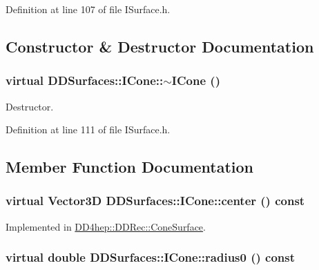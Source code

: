 Definition at line 107 of file ISurface.h.

\subsection{Constructor \& Destructor Documentation}
\hypertarget{class_d_d_surfaces_1_1_i_cone_a7693726c5c65f892a24e244b12acbf17}{
\subsubsection[{$\sim$ICone}]{\setlength{\rightskip}{0pt plus 5cm}virtual DDSurfaces::ICone::$\sim$ICone ()}}
\label{class_d_d_surfaces_1_1_i_cone_a7693726c5c65f892a24e244b12acbf17}


Destructor. 

Definition at line 111 of file ISurface.h.

\subsection{Member Function Documentation}
\hypertarget{class_d_d_surfaces_1_1_i_cone_a2543c4f2ec55d1ace4464652a0c89bce}{
\subsubsection[{center}]{\setlength{\rightskip}{0pt plus 5cm}virtual {\bf Vector3D} DDSurfaces::ICone::center () const}}
\label{class_d_d_surfaces_1_1_i_cone_a2543c4f2ec55d1ace4464652a0c89bce}


Implemented in \hyperlink{class_d_d4hep_1_1_d_d_rec_1_1_cone_surface_abfdad3ecbda7070c2b2b4b4d48b23ccb}{DD4hep::DDRec::ConeSurface}.\hypertarget{class_d_d_surfaces_1_1_i_cone_af7be60438f58e45d5e82a2d826a0a7d7}{
\subsubsection[{radius0}]{\setlength{\rightskip}{0pt plus 5cm}virtual double DDSurfaces::ICone::radius0 () const}}
\label{class_d_d_surfaces_1_1_i_cone_af7be60438f58e45d5e82a2d826a0a7d7}


